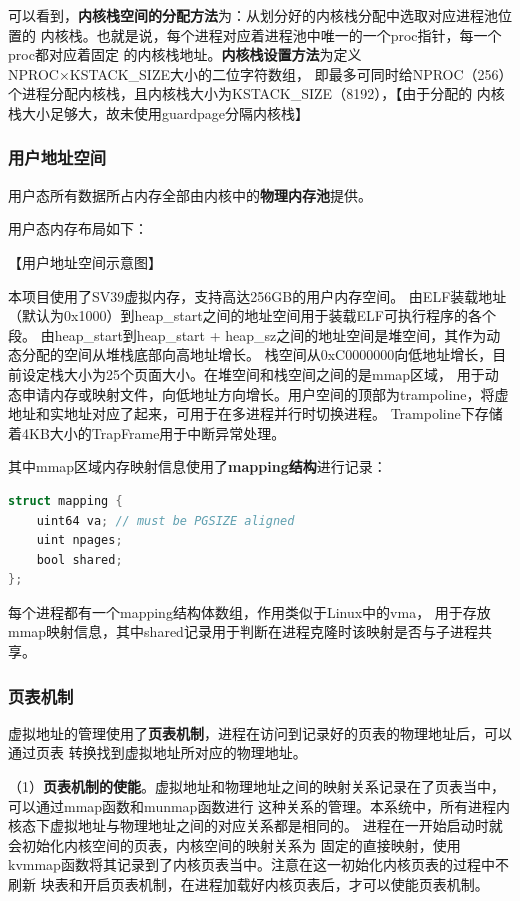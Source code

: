\documentclass[UTF8,a4paper,10pt]{ctexart}
\begin{document}
可以看到，\textbf{内核栈空间的分配方法}为：从划分好的内核栈分配中选取对应进程池位置的
内核栈。也就是说，每个进程对应着进程池中唯一的一个proc指针，每一个proc都对应着固定
的内核栈地址。\textbf{内核栈设置方法}为定义NPROC×KSTACK\_SIZE大小的二位字符数组，
即最多可同时给NPROC（256）个进程分配内核栈，且内核栈大小为KSTACK\_SIZE（8192），【由于分配的
内核栈大小足够大，故未使用guardpage分隔内核栈】

\subsubsection{用户地址空间}

用户态所有数据所占内存全部由内核中的\textbf{物理内存池}提供。

用户态内存布局如下：

【用户地址空间示意图】

本项目使用了SV39虚拟内存，支持高达256GB的用户内存空间。
由ELF装载地址（默认为0x1000）到heap\_start之间的地址空间用于装载ELF可执行程序的各个段。
由heap\_start到heap\_start + heap\_sz之间的地址空间是堆空间，其作为动态分配的空间从堆栈底部向高地址增长。
栈空间从0xC0000000向低地址增长，目前设定栈大小为25个页面大小。在堆空间和栈空间之间的是mmap区域，
用于动态申请内存或映射文件，向低地址方向增长。用户空间的顶部为trampoline，将虚地址和实地址对应了起来，可用于在多进程并行时切换进程。
Trampoline下存储着4KB大小的TrapFrame用于中断异常处理。

其中mmap区域内存映射信息使用了\textbf{mapping结构}进行记录：

\begin{lstlisting}[title=mapping结构,frame=trbl,language={C}]
  struct mapping {
    uint64 va; // must be PGSIZE aligned
    uint npages;
    bool shared;
};
  \end{lstlisting}

每个进程都有一个mapping结构体数组，作用类似于Linux中的vma，
用于存放mmap映射信息，其中shared记录用于判断在进程克隆时该映射是否与子进程共享。

\subsubsection{页表机制}

虚拟地址的管理使用了\textbf{页表机制}，进程在访问到记录好的页表的物理地址后，可以通过页表
转换找到虚拟地址所对应的物理地址。

（1）\textbf{页表机制的使能}。虚拟地址和物理地址之间的映射关系记录在了页表当中，可以通过mmap函数和munmap函数进行
这种关系的管理。本系统中，所有进程内核态下虚拟地址与物理地址之间的对应关系都是相同的。
进程在一开始启动时就会初始化内核空间的页表，内核空间的映射关系为
固定的直接映射，使用kvmmap函数将其记录到了内核页表当中。注意在这一初始化内核页表的过程中不刷新
块表和开启页表机制，在进程加载好内核页表后，才可以使能页表机制。
\end{document}
